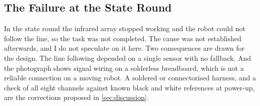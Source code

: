\subsection{The Failure at the State Round}
In the state round the infrared array stopped working and the robot could not follow the
line, so the task was not completed. The cause was not
established afterwards, and I do not speculate on it here. Two consequences are drawn for
the design. The line following depended on a single sensor with no fallback. And the photograph shows
signal wiring on a solderless breadboard, which is not a reliable connection on a moving
robot. A soldered or connectorised harness, and a check of all eight channels against known
black and white references at power-up, are the corrections proposed
in \cref{sec:discussion}.
